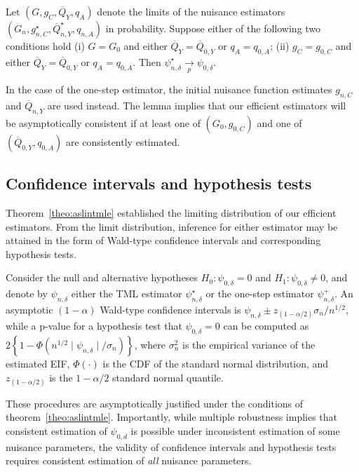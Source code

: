 \begin{lemma}\label{lemma:mult_robust}
  Let $(G, g_{C}, \overline{Q}_{Y}, q_{A})$ denote the limits of the nuisance
  estimators $(G_n, g^{\star}_{n,C}, \overline{Q}^{\star}_{n,Y}, q_{n,A})$ in
  probability. Suppose either of the following two conditions hold (i)
  $G = G_0$ and either $\overline{Q}_{Y} = \overline{Q}_{0,Y}$ or $q_{A} =
  q_{0,A}$; (ii) $g_{C} = g_{0,C}$ and either $\overline{Q}_{Y} =
  \overline{Q}_{0,Y}$ or $q_{A} = q_{0,A}$. Then $\psi_{n,\delta}^{\star}
  \xrightarrow[p]{} \psi_{0,\delta}$.
\end{lemma}
In the case of the one-step estimator, the initial nuisance function estimates
$g_{n,C}$ and $\overline{Q}_{n,Y}$ are used instead. The lemma implies that our
efficient estimators will be asymptotically consistent if at least one of
$(G_0, g_{0,C})$ and one of $(\overline{Q}_{0,Y}, q_{0,A})$ are consistently
estimated.

\subsection{Confidence intervals and hypothesis tests}\label{inference}

Theorem~\ref{theo:aslintmle} established the limiting distribution of our
efficient estimators. From the limit distribution, inference for either
estimator may be attained in the form of Wald-type confidence intervals and
corresponding hypothesis tests.

Consider the null and alternative hypotheses $H_0: \psi_{0,\delta} = 0$ and
$H_1: \psi_{0,\delta} \neq 0$, and denote by $\psi_{n,\delta}$ either the TML
estimator $\psi_{n,\delta}^{\star}$ or the one-step estimator
$\psi_{n,\delta}^{+}$. An asymptotic $(1 - \alpha)$ Wald-type confidence
intervals is $\psi_{n,\delta} \pm z_{\left(1 - \alpha/2\right)} \sigma_n
/ n^{1/2}$, while a p-value for a hypothesis test that $\psi_{0,\delta} = 0$ can
be computed as $2 \left\{1 - \Phi \left(n^{1/2} \mid \psi_{n,\delta}
\mid/\sigma_n \right) \right\}$, where $\sigma^2_n$ is the empirical variance of
the estimated EIF, $\Phi(\cdot)$ is the CDF of the standard normal distribution,
and $z_{\left(1 - \alpha/2\right)}$ is the $1-\alpha/2$ standard normal
quantile.

These procedures are asymptotically justified under the conditions of
theorem~\ref{theo:aslintmle}. Importantly, while multiple robustness implies
that consistent estimation of $\psi_{0,d}$ is possible under inconsistent
estimation of some nuisance parameters, the validity of confidence intervals and
hypothesis tests requires consistent estimation of \emph{all} nuisance
parameters.

